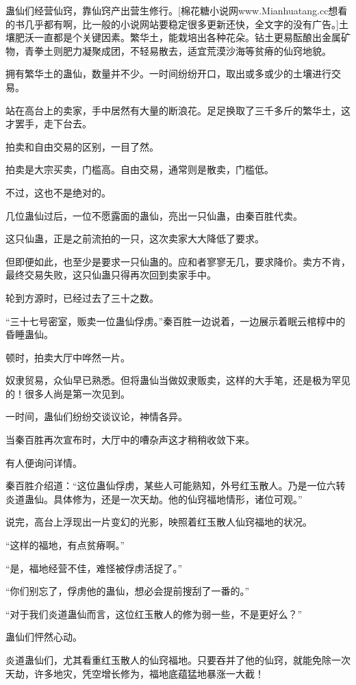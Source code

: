 \begin{this_body}
蛊仙们经营仙窍，靠仙窍产出营生修行。[棉花糖小说网www.Mianhuatang.cc想看的书几乎都有啊，比一般的小说网站要稳定很多更新还快，全文字的没有广告。]土壤肥沃一直都是个关键因素。繁华土，能栽培出各种花朵。钻土更易酝酿出金属矿物，青拳土则肥力凝聚成团，不轻易散去，适宜荒漠沙海等贫瘠的仙窍地貌。

拥有繁华土的蛊仙，数量并不少。一时间纷纷开口，取出或多或少的土壤进行交易。

站在高台上的卖家，手中居然有大量的断浪花。足足换取了三千多斤的繁华土，这才罢手，走下台去。

拍卖和自由交易的区别，一目了然。

拍卖是大宗买卖，门槛高。自由交易，通常则是散卖，门槛低。

不过，这也不是绝对的。

几位蛊仙过后，一位不愿露面的蛊仙，亮出一只仙蛊，由秦百胜代卖。

这只仙蛊，正是之前流拍的一只，这次卖家大大降低了要求。

但即便如此，也至少是要求一只仙蛊的。应和者寥寥无几，要求降价。卖方不肯，最终交易失败，这只仙蛊只得再次回到卖家手中。

轮到方源时，已经过去了三十之数。

“三十七号密室，贩卖一位蛊仙俘虏。”秦百胜一边说着，一边展示着眠云棺椁中的昏睡蛊仙。

顿时，拍卖大厅中哗然一片。

奴隶贸易，众仙早已熟悉。但将蛊仙当做奴隶贩卖，这样的大手笔，还是极为罕见的！很多人尚是第一次见到。

一时间，蛊仙们纷纷交谈议论，神情各异。

当秦百胜再次宣布时，大厅中的嘈杂声这才稍稍收敛下来。

有人便询问详情。

秦百胜介绍道：“这位蛊仙俘虏，某些人可能熟知，外号红玉散人。乃是一位六转炎道蛊仙。具体修为，还是一次天劫。他的仙窍福地情形，诸位可观。”

说完，高台上浮现出一片变幻的光影，映照着红玉散人仙窍福地的状况。

“这样的福地，有点贫瘠啊。”

“是，福地经营不佳，难怪被俘虏活捉了。”

“你们别忘了，俘虏他的蛊仙，想必会提前搜刮了一番的。”

“对于我们炎道蛊仙而言，这位红玉散人的修为弱一些，不是更好么？”

蛊仙们怦然心动。

炎道蛊仙们，尤其看重红玉散人的仙窍福地。只要吞并了他的仙窍，就能免除一次天劫，许多地灾，凭空增长修为，福地底蕴猛地暴涨一大截！


\end{this_body}
